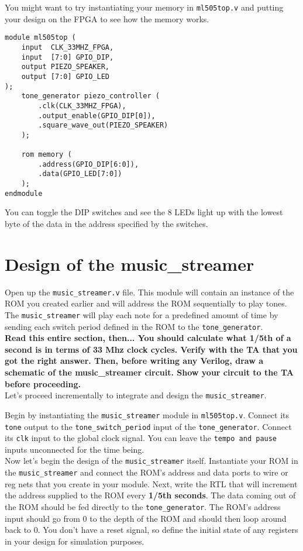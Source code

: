 \documentclass[11pt]{article}
\begin{document}
You might want to try instantiating your memory in \verb|ml505top.v| and putting your design on the FPGA to see how the memory works.

\begin{verbatim}
module ml505top (
	input  CLK_33MHZ_FPGA,
	input  [7:0] GPIO_DIP,
	output PIEZO_SPEAKER,
	output [7:0] GPIO_LED
);    
	tone_generator piezo_controller (
		.clk(CLK_33MHZ_FPGA),
		.output_enable(GPIO_DIP[0]),
		.square_wave_out(PIEZO_SPEAKER)
	);

	rom memory (
		.address(GPIO_DIP[6:0]),
		.data(GPIO_LED[7:0])
	);
endmodule
\end{verbatim}

You can toggle the DIP switches and see the 8 LEDs light up with the lowest byte of the data in the address specified by the switches.
\section{Design of the music\_streamer}
Open up the \verb|music_streamer.v| file. This module will contain an instance of the ROM you created earlier and will address the ROM sequentially to play tones. The \verb|music_streamer| will play each note for a predefined amount of time by sending each switch period defined in the ROM to the \verb|tone_generator|.\\

\textbf{Read this entire section, then... You should calculate what 1/5th of a second is in terms of 33 Mhz clock cycles. Verify with the TA that you got the right answer. Then, before writing any Verilog, draw a schematic of the music\_streamer circuit. Show your circuit to the TA before proceeding.}\\

Let's proceed incrementally to integrate and design the \verb|music_streamer|.

Begin by instantiating the \verb|music_streamer| module in \verb|ml505top.v|. Connect its \verb|tone| output to the \verb|tone_switch_period| input of the \verb|tone_generator|. Connect its \verb|clk| input to the global clock signal. You can leave the \verb|tempo and pause| inputs unconnected for the time being.\\

Now let's begin the design of the \verb|music_streamer| itself. Instantiate your ROM in the \verb|music_streamer| and connect the ROM's address and data ports to wire or reg nets that you create in your module. Next, write the RTL that will increment the address supplied to the ROM every \textbf{1/5th seconds}. The data coming out of the ROM should be fed directly to the \verb|tone_generator|. The ROM's address input should go from 0 to the depth of the ROM and should then loop around back to 0. You don't have a reset signal, so define the initial state of any registers in your design for simulation purposes.
\end{document}
